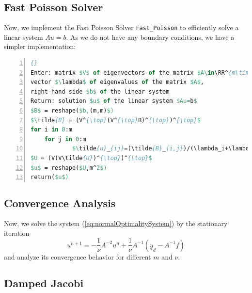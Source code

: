 \documentclass{amsart}
\theoremstyle{definition}
\theoremstyle{remark}
\numberwithin{equation}{section}
\newcommand{\RR}{\mathbb{R}}
\begin{document}

\subsection{Fast Poisson Solver}
Now, we implement the Fast Poisson Solver \texttt{Fast\_Poisson} to efficiently solve a linear system $Au=b$. As we do not have any boundary conditions, we have a simpler implementation:

\begin{lstlisting}[mathescape, language=Pascal, title=Fast\_Poisson,
frame=single, numbers=left, numberstyle=\tiny, tabsize=2,
morekeywords={Enter, Return, elif}, deletekeywords={of}, keywordstyle=\bfseries]{}
Enter: matrix $V$ of eigenvectors of the matrix $A\in\RR^{m\times m}$, 
vector $\lambda$ of eigenvalues of the matrix $A$, 
right-hand side $b$ of the linear system
Return: solution $u$ of the linear system $Au=b$
$B$ = reshape($b,(m,m)$)
$\tilde{B} = (V^{\top}(V^{\top}B)^{\top})^{\top}$
for i in 0:m
	for j in 0:m
			$\tilde{u}_{ij}=(\tilde{B}_{i,j})/(\lambda_i+\lambda_j)$
$U = (V(V\tilde{U})^{\top})^{\top}$
$u$ = reshape($U,m^2$)
return($u$)
\end{lstlisting}


\subsection{Convergence Analysis}
Now, we solve the system (\ref{eq:normalOptimalitySystem}) by the stationary iteration
\begin{equation}
\underline{u}^{n+1} = -\frac{1}{\nu} A^{-2}\underline{u}^n + \frac{1}{\nu} A^{-1} (\underline{y}_d-A^{-1}\underline{f})
\end{equation}
and analyze its convergence behavior for different $m$ and $\nu$.

\subsection{Damped Jacobi}

\newpage
\end{document}

